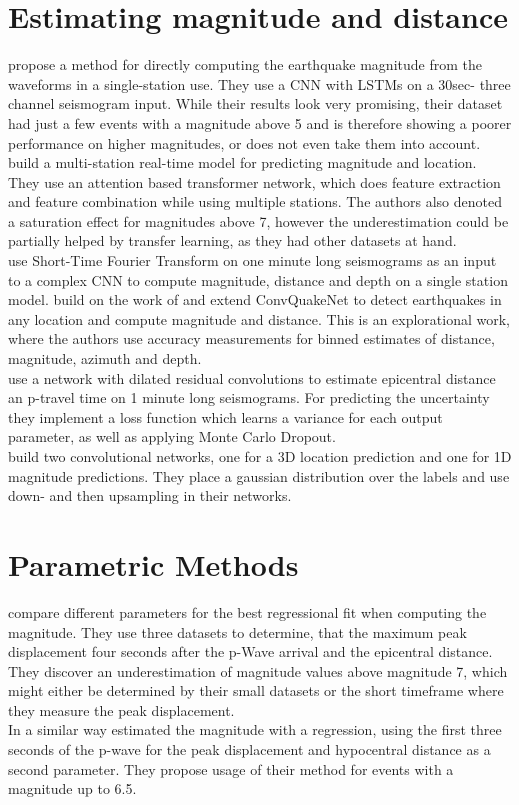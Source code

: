 \documentclass[thesis.tex]{subfiles}
\begin{document}
\section{Estimating magnitude and distance}
\cite{mousavi2020machine} propose a method for directly computing the earthquake magnitude from the waveforms in a single-station use. They use a CNN with LSTMs on a 30sec- three channel seismogram input. While their results look very promising, their dataset had just a few events with a magnitude above 5 and is therefore showing a poorer performance on higher magnitudes, or does not even take them into account. \\
\cite{munchmeyer2021earthquake} build a multi-station real-time model for predicting magnitude and location. They use an attention based transformer network, which does feature extraction and feature combination while using multiple stations. The authors also denoted a saturation effect for magnitudes above 7, however the underestimation could be partially helped by transfer learning, as they had other datasets at hand.\\
\cite{ristea2021complex} use Short-Time Fourier Transform on one minute long seismograms as an input to a complex CNN to compute magnitude, distance and depth on a single station model.
\cite{lomax2019investigation} build on the work of \cite{perol2018convolutional} and extend ConvQuakeNet to detect earthquakes in any location and compute magnitude and distance. This is an explorational work, where the authors use accuracy measurements for binned estimates of distance, magnitude, azimuth and depth.\\
\cite{mousavi2019bayesian} use a network with dilated residual convolutions to estimate epicentral distance an p-travel time on 1 minute long seismograms. For predicting the uncertainty they implement a loss function which learns a variance for each output parameter, as well as applying Monte Carlo Dropout.\\
\cite{zhang2021real} build two convolutional networks, one for a 3D location prediction and one for 1D magnitude predictions. They place a gaussian distribution over the labels and use down- and then upsampling in their networks.

\section{Parametric Methods}
\cite{kuyuk2013global} compare different parameters for the best regressional fit when computing the magnitude. They use three datasets to determine, that the maximum peak displacement four seconds after the p-Wave arrival and the epicentral distance. They discover an underestimation of magnitude values above magnitude 7, which might either be determined by their small datasets or the short timeframe where they measure the peak displacement.\\
In a similar way \cite{wu2006magnitude} estimated the magnitude with a regression, using the first three seconds of the p-wave for the peak displacement and hypocentral distance as a second parameter. They propose usage of their method for events with a magnitude up to 6.5.
\subfilebib %
\end{document}
